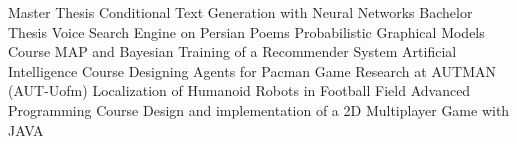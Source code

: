 

\begin{cventries}
\cventry
{Master Thesis}
{Conditional Text Generation with Neural Networks}
{}{}{}
\cventry
{Bachelor Thesis}
{Voice Search Engine on Persian Poems}
{}{}{}
\cventry
{Probabilistic Graphical Models Course}
{MAP and Bayesian Training of a Recommender System}
{}{}{}
\cventry
{Artificial Intelligence Course}
{Designing Agents for Pacman Game}
{}{}{}
\cventry
{Research at AUTMAN (AUT-Uofm)}
{Localization of Humanoid Robots in Football Field}
{}{}{}
\cventry
{Advanced Programming Course}
{Design and implementation of a 2D Multiplayer Game with JAVA}
{}{}{}
\end{cventries}
